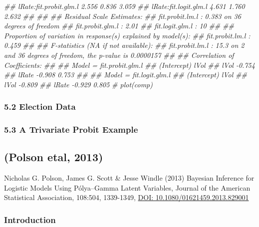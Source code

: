 \documentclass[
]{article}
\newenvironment{Shaded}{\begin{snugshade}}{\end{snugshade}}
\newcommand{\CommentTok}[1]{\textcolor[rgb]{0.56,0.35,0.01}{\textit{#1}}}
\begin{document}
\begin{Shaded}
\begin{Highlighting}[]
\CommentTok{## lRate:fit.probit.glm.l        2.556    0.836      3.059 }
\CommentTok{## lRate:fit.logit.glm.l         4.631    1.760      2.632 }
\CommentTok{## }
\CommentTok{## }
\CommentTok{## Residual Scale Estimates:}
\CommentTok{## fit.probit.lm.l  : 0.383 on 36 degrees of freedom}
\CommentTok{## fit.probit.glm.l : 2.01 }
\CommentTok{## fit.logit.glm.l  : 10 }
\CommentTok{## }
\CommentTok{## Proportion of variation in response(s) explained by model(s):}
\CommentTok{## fit.probit.lm.l  : 0.459 }
\CommentTok{## }
\CommentTok{## F-statistics (NA if not available):}
\CommentTok{## fit.probit.lm.l  : 15.3 on 2 and 36 degrees of freedom, the  p-value is 0.0000157 }
\CommentTok{## }
\CommentTok{## Correlation of Coefficients:}
\CommentTok{## }
\CommentTok{## Model =  fit.probit.glm.l }
\CommentTok{##       (Intercept) lVol  }
\CommentTok{## lVol  -0.754            }
\CommentTok{## lRate -0.908       0.753}
\CommentTok{## }
\CommentTok{## Model =  fit.logit.glm.l  }
\CommentTok{##       (Intercept) lVol  }
\CommentTok{## lVol  -0.809            }
\CommentTok{## lRate -0.929       0.805}
\CommentTok{# plot(comp)}
\end{Highlighting}
\end{Shaded}

\hypertarget{election-data}{%
\subsubsection{5.2 Election Data}\label{election-data}}

\hypertarget{a-trivariate-probit-example}{%
\subsubsection{5.3 A Trivariate Probit
Example}\label{a-trivariate-probit-example}}

\hypertarget{polson-etal-2013}{%
\subsection{(Polson etal, 2013)}\label{polson-etal-2013}}

Nicholas G. Polson, James G. Scott \& Jesse Windle (2013) Bayesian
Inference for Logistic Models Using Pólya--Gamma Latent Variables,
Journal of the American Statistical Association, 108:504, 1339-1349,
\href{https://www.tandfonline.com/doi/full/10.1080/01621459.2013.829001}{DOI:
10.1080/01621459.2013.829001}

\hypertarget{introduction-2}{%
\subsubsection{Introduction}\label{introduction-2}}
\end{document}
